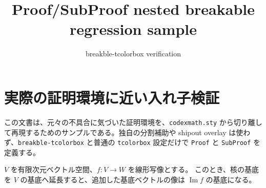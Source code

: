 \documentclass[a4paper,11pt]{ltjsarticle}
\title{Proof/SubProof nested breakable regression sample}
\author{breakble-tcolorbox verification}
\date{}
\begin{document}
\maketitle

\section{実際の証明環境に近い入れ子検証}

この文書は、元々の不具合に気づいた証明環境を、\texttt{codexmath.sty}
から切り離して再現するためのサンプルである。独自の分割補助や
shipout overlay は使わず、\texttt{breakble-tcolorbox} と普通の
\texttt{tcolorbox} 設定だけで \texttt{Proof} と \texttt{SubProof} を定義する。

\begin{tcolorbox}[
  enhanced,
  breakable,
  sharp corners,
  colback=white,
  colframe=black,
  fonttitle=\gtfamily\sffamily\bfseries,
  title={検証用定理}
]
$V$ を有限次元ベクトル空間、$f\colon V\to W$ を線形写像とする。
このとき、核の基底を $V$ の基底へ延長すると、追加した基底ベクトルの像は
$\operatorname{Im} f$ の基底になる。
\end{tcolorbox}
\end{document}
